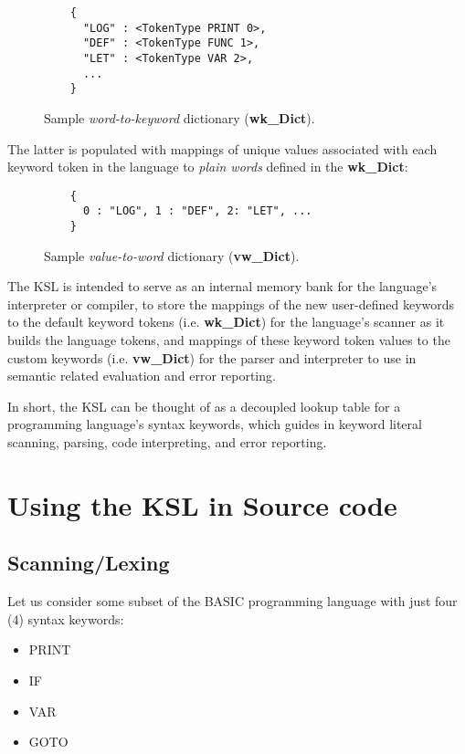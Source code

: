 \documentclass{article}
\begin{document}
\begin{figure}[ht]
  \centering
  \begin{verbatim}
    {
      "LOG" : <TokenType PRINT 0>,
      "DEF" : <TokenType FUNC 1>,
      "LET" : <TokenType VAR 2>,
      ...
    }
  \end{verbatim}
  \caption{Sample \textit{word-to-keyword} dictionary (\textbf{wk\_Dict}).}
  \label{fig:wk_Dict}
\end{figure}

The latter is populated with mappings of unique values associated with each keyword token in the language to \textit{plain words} defined in the \textbf{wk\_Dict}:

\begin{figure}[ht]
  \centering
  \begin{verbatim}
    { 
      0 : "LOG", 1 : "DEF", 2: "LET", ...
    }
  \end{verbatim}
  \caption{Sample \textit{value-to-word} dictionary (\textbf{vw\_Dict}).}
  \label{fig:vw_Dict}
\end{figure}

The KSL is intended to serve as an internal memory bank for the language's interpreter or compiler, to store the mappings of the new user-defined keywords to the default keyword tokens (i.e. \textbf{wk\_Dict}) for the language's scanner as it builds the language tokens, and mappings of these keyword token values to the custom keywords (i.e. \textbf{vw\_Dict}) for the parser and interpreter to use in semantic related evaluation and error reporting. 

In short, the KSL can be thought of as a decoupled lookup table for a programming language's syntax keywords, which guides in keyword literal scanning, parsing, code interpreting, and error reporting.

\section{Using the KSL in Source code}

\subsection{Scanning/Lexing}

Let us consider some subset of the BASIC \cite{BASIC} programming language with just four (4) syntax keywords:

\begin{itemize}
    \item PRINT
    \item IF
    \item VAR
    \item GOTO
\end{itemize}
\end{document}
